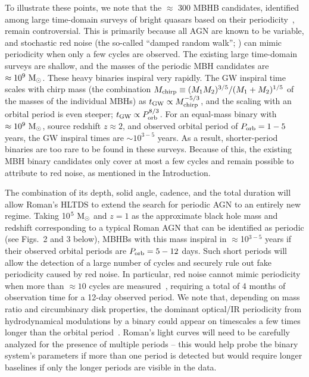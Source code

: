 \documentclass[tightenlines,superscriptaddress,amsmath,amssymb,prl,12pt]{revtex4-1}
\newcommand{\msun}{{\rm M}_\odot}
\begin{document}
To illustrate these points, we note that the $\approx$ 300 MBHB
candidates, identified among large time-domain surveys of bright
quasars based on their
periodicity~\cite{Graham+2015b,Charisi+2016,Liu+2019,Chen+2022},
remain controversial. This is primarily because all AGN are known to
be variable, and stochastic red noise (the so-called ``damped random
walk''; \cite{Macleod2010}) can mimic periodicity when only a few
cycles are observed.  The existing large time-domain surveys are
shallow, and the masses of the periodic MBH candidates are
$\approx10^9~\msun$.  These heavy binaries inspiral very rapidly.  The
GW inspiral time scales with chirp mass (the combination $M_{\rm
  chirp}\equiv(M_1M_2)^{3/5}/(M_1+M_2)^{1/5}$ of the masses of the
individual MBHs) as $t_{\rm GW}\propto M_{\rm chirp}^{-5/3}$, and the
scaling with an orbital period is even steeper; $t_{\rm GW}\propto
P_{\rm orb}^{8/3}$.  For an equal-mass binary with
$\approx10^9~\msun$, source redshift $z\approx 2$, and observed
orbital period of $P_{\rm orb}=1-5$ years, the GW inspiral times are
$\sim 10^{3-5}$ years. As a result, shorter-period binaries are too
rare to be found in these surveys.  Because of this, the existing MBH
binary candidates only cover at most a few cycles and remain possible
to attribute to red noise, as mentioned in the Introduction.


The combination of its depth, solid angle, cadence, and the total
duration will allow Roman's HLTDS to extend the search for periodic
AGN to an entirely new regime. Taking 10$^5~\msun$ and $z=1$ as the
approximate black hole mass and redshift corresponding to a typical
Roman AGN that can be identified as periodic (see Figs.~2 and 3
below), MBHBs with this mass inspiral in $\approx$10$^{3-5}$ years if
their observed orbital periods are $P_{\rm orb}=5-12$ days.  Such
short periods will allow the detection of a large number of cycles and
securely rule out fake periodicity caused by red noise.  In
particular, red noise cannot mimic periodicity when more than $\approx
10$ cycles are measured~\cite{Vaughan2016}, requiring a total of 4
months of observation time for a 12-day observed period.  We note
that, depending on mass ratio and circumbinary disk properties, the
dominant optical/IR periodicity from hydrodynamical modulations by a
binary could appear on timescales a few times longer than the orbital
period~\cite{Dorazio+2015}. Roman's light curves will need to be
carefully analyzed for the presence of multiple periods -- this would
help probe the binary system's parameters if more than one period is
detected but would require longer baselines if only the longer periods
are visible in the data.
\end{document}

